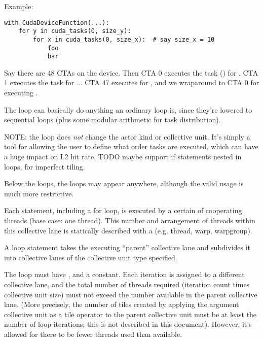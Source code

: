 \filbreak
Example:
{\color{lightttColor}
\begin{verbatim}
with CudaDeviceFunction(...):
    for y in cuda_tasks(0, size_y):
        for x in cuda_tasks(0, size_x):  # say size_x = 10
            foo
            bar
\end{verbatim}
}
Say there are 48 CTAs on the device.
Then CTA 0 executes the task () for , CTA 1 executes the task for  ... CTA 47 executes for , and we wraparound to CTA 0 for executing .

\filbreak
The  loop can basically do anything an ordinary  loop is, since they're lowered to sequential loops (plus some modular arithmetic for task distribution).

\filbreak
NOTE: the  loop does \textit{not} change the actor kind or collective unit.
It's simply a tool for allowing the user to define what order tasks are executed, which can have a huge impact on L2 hit rate.
TODO maybe support if statements nested in  loops, for imperfect tiling.

\filbreak
{} Below the  loops, the  loops may appear anywhere, although the valid usage is much more restrictive.

Each statement, including a for loop, is executed by a certain  of cooperating threads (base case: one thread).
This number and arrangement of threads within this collective lane is statically described with a  (e.g. thread, warp, warpgroup).

\filbreak
A  loop statement takes the executing ``parent'' collective lane and subdivides it into collective lanes of the collective unit type specified.

\filbreak
The loop must have , and  a constant.
Each iteration is assigned to a different collective lane, and the total number of threads required (iteration count times collective unit size) must not exceed the number available in the parent collective lane.
(More precisely, the number of tiles created by applying the argument collective unit as a tile operator to the parent collective unit must be at least the number of loop iterations; this is not described in this document).
However, it's allowed for there to be fewer threads used than available.

